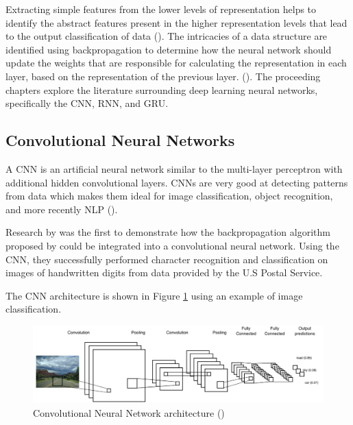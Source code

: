 Extracting simple features from the lower levels of representation helps to identify the abstract features present in the higher representation levels that lead to the output classification of data (\cite{bengio_deep_2011}).
%
The intricacies of a data structure are identified using backpropagation to determine how the neural network should update the weights that are responsible for calculating the representation in each layer, based on the representation of the previous layer. (\cite{lecun_deep_2015}). The proceeding chapters explore the literature surrounding deep learning neural networks, specifically the \acrfull{CNN}, \acrfull{RNN}, and \acrfull{GRU}.

\subsection{Convolutional Neural Networks}

A \acrfull{CNN} is an artificial neural network similar to the multi-layer perceptron with additional hidden convolutional layers. \acrshort{CNN}s are very good at detecting patterns from data which makes them ideal for image classification, object recognition, and more recently \acrfull{NLP} (\cite{young_cnns_recent_2018}).

Research by \cite{lecun_backprop_cnn_1989} was the first to demonstrate how the backpropagation algorithm proposed by \cite{rumelhart_learning_1986} could be integrated into a convolutional neural network.
Using the \acrshort{CNN}, they successfully performed character recognition and classification on images of handwritten digits from data provided by the U.S Postal Service.

The \acrshort{CNN} architecture is shown in Figure \ref{fig:cnn_1} using an example of image classification.

\begin{figure}[ht!]
\centering
\includegraphics[width=1\textwidth]{media/literature/machine_learning/ml_cnn_1.png}
\caption[Diagram of a convolutional neural network architecture]{Convolutional Neural Network architecture (\cite{lopez_deep_2017})}
\label{fig:cnn_1}
\end{figure}

